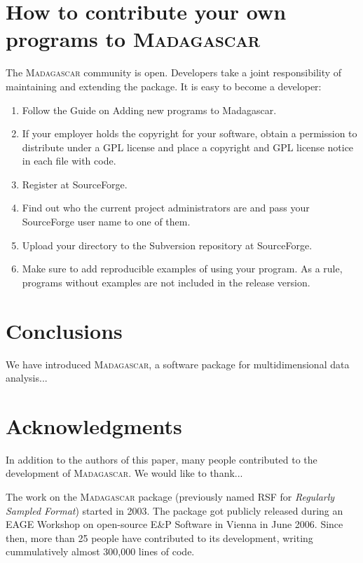 \section{How to contribute your own programs to \textsc{Madagascar}}

The \textsc{Madagascar} community is open. Developers take a joint
responsibility of maintaining and extending the package. It is easy to
become a developer:
\begin{enumerate}
\item  Follow the Guide on Adding new programs to Madagascar.
\item  If your employer holds the copyright for your software, 
obtain a permission to distribute under a GPL license and place a
copyright and GPL license notice in each file with code.
\item Register at SourceForge.
\item Find out who the current project administrators are and pass your SourceForge
user name to one of them.
\item Upload your directory to the Subversion repository at SourceForge.
\item Make sure to add reproducible examples of using your program. 
As a rule, programs without examples are not included in the release
version.
\end{enumerate}	

\section{Conclusions}

We have introduced \textsc{Madagascar}, a software package for
multidimensional data analysis...

\section{Acknowledgments}

In addition to the authors of this paper, many people contributed to
the development of \textsc{Madagascar}. We would like to thank...



The work on the \textsc{Madagascar} package (previously named RSF for
\emph{Regularly Sampled Format}) started in 2003.  The package got
publicly released during an EAGE Workshop on open-source E\&P Software
in Vienna in June 2006. Since then, more than 25 people have
contributed to its development, writing cummulatively almost
300,000 lines of code.

